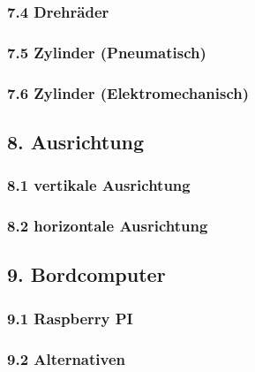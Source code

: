\subsubsection{7.4 Drehräder}

\subsubsection{7.5 Zylinder (Pneumatisch)}

\subsubsection{7.6 Zylinder (Elektromechanisch)}

\subsection{8. Ausrichtung}

\subsubsection{8.1 vertikale Ausrichtung}

\subsubsection{8.2 horizontale Ausrichtung}

\subsection{9. Bordcomputer}

\subsubsection{9.1 Raspberry PI}

\subsubsection{9.2 Alternativen}

